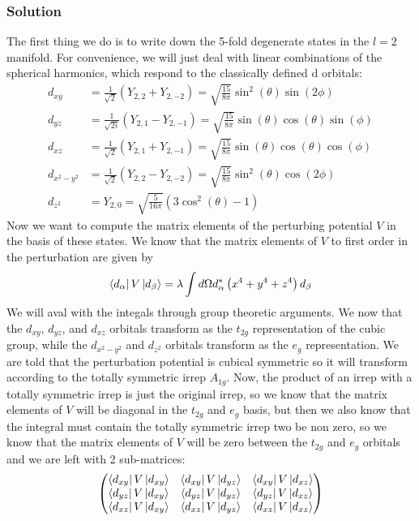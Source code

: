 \documentclass{article}
\begin{document}
\subsubsection{Solution}
The first thing we do is to write down the 5-fold degenerate states in the $l=2$ manifold. For convenience, we will just deal with linear combinations of the spherical harmonics, which respond to the classically defined d orbitals:
\begin{align}
    d_{xy} &= \frac{1}{\sqrt{2}}(Y_{2, 2} + Y_{2, -2}) = \sqrt{\frac{15}{8\pi}}\sin^2(\theta)\sin(2\phi)\\
    d_{yz} &= \frac{1}{\sqrt{2i}}(Y_{2, 1} - Y_{2, -1}) = \sqrt{\frac{15}{8\pi}}\sin(\theta)\cos(\theta)\sin(\phi)\\
    d_{xz} &= \frac{1}{\sqrt{2}}(Y_{2, 1} + Y_{2, -1}) = \sqrt{\frac{15}{8\pi}}\sin(\theta)\cos(\theta)\cos(\phi)\\
    d_{x^2-y^2} &= \frac{1}{\sqrt{2}}(Y_{2, 2} - Y_{2, -2}) = \sqrt{\frac{15}{8\pi}}\sin^2(\theta)\cos(2\phi)\\
    d_{z^2} &= Y_{2, 0} = \sqrt{\frac{5}{16\pi}}(3\cos^2(\theta) - 1)
\end{align}
Now we want to compute the matrix elements of the perturbing potential $V$ in the basis of these states. We know that the matrix elements of $V$ to first order in the perturbation are given by
\begin{equation}
    \bra{d_{\alpha}}V\ket{d_{\beta}} = \lambda\int d\Omega d_{\alpha}^*\left(x^4 + y^4 + z^4\right)d_{\beta}
\end{equation}
 We will aval with the integals through group theoretic arguments. We now that the $d_{xy}$, $d_{yz}$, and $d_{xz}$ orbitals transform as the $t_{2g}$ representation of the cubic group, while the $d_{x^2-y^2}$ and $d_{z^2}$ orbitals transform as the $e_g$ representation. We are told that the perturbation potential is cubical symmetric so it will transform according to the totally symmetric irrep $A_{1g}$. Now, the product of an irrep with a totally symmetric irrep is just the original irrep, so we know that the matrix elements of $V$ will be diagonal in the $t_{2g}$ and $e_g$ basis, but then we also know that the integral must contain the totally symmetric irrep two be non zero, so we know that the matrix elements of $V$ will be zero between the $t_{2g}$ and $e_g$ orbitals and we are left with 2 sub-matrices:
\begin{equation}
    \begin{pmatrix}
    \bra{d_{xy}}V\ket{d_{xy}} & \bra{d_{xy}}V\ket{d_{yz}} & \bra{d_{xy}}V\ket{d_{xz}}\\
    \bra{d_{yz}}V\ket{d_{xy}} & \bra{d_{yz}}V\ket{d_{yz}} & \bra{d_{yz}}V\ket{d_{xz}}\\
    \bra{d_{xz}}V\ket{d_{xy}} & \bra{d_{xz}}V\ket{d_{yz}} & \bra{d_{xz}}V\ket{d_{xz}}
    \end{pmatrix}
\end{equation}
\end{document}
